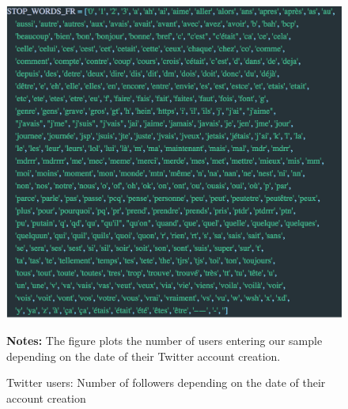 \begin{figure}[h]
\begin{center}
\includegraphics[scale=.7]{figures/stop_words.png}
\end{center}
	\begin{spacing}{0.5}
		{\footnotesize \textbf{Notes:} The figure plots the number of users entering our sample depending on the date of their Twitter account creation.}
	\end{spacing}
\vspace{.5cm}	
	\caption{Twitter users: Number of followers depending on the date of their account creation}
	\label{fig:stop_words}
\end{figure}




%



